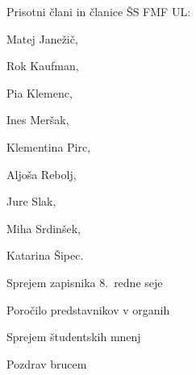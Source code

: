 \documentclass{seja}
\begin{document}
  
  Prisotni člani in članice ŠS FMF UL:

  Matej Janežič,

  Rok Kaufman,

  Pia Klemenc,

  Ines Meršak,

  Klementina Pirc,

  Aljoša Rebolj,

  Jure Slak,

  Miha Srdinšek,

  Katarina Šipec.

  
  \begin{red*}

    \item Sprejem zapisnika 8.~redne seje

    \item Poročilo predstavnikov v organih

    \item Sprejem študentskih mnenj

    \item Pozdrav brucem

  \end{red*}
\end{document}
